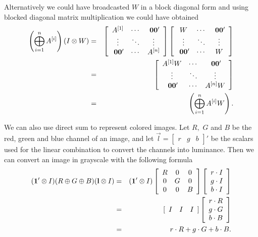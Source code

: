 \documentclass{sapthesis}
\begin{document}
Alternatively we could have broadcasted \(W\) in a block diagonal form and using
blocked diagonal matrix multiplication we could have obtained
\begin{eqnarray*}
\left(\bigoplus_{i=1}^n A^{[i]}\right) (I \krone W)
&=& \left[\begin{array}{ccc}
    A^{[1]} & \cdots & \Z \\
    \vdots & \ddots & \vdots \\
    \Z & \cdots & A^{[n]}
\end{array}\right]
\left[\begin{array}{ccc}
    W & \cdots & \Z \\
    \vdots & \ddots & \vdots \\
    \Z & \cdots & W
\end{array}\right] \\
&=& \left[\begin{array}{ccc}
    A^{[1]} W & \cdots & \Z \\
    \vdots & \ddots & \vdots \\
    \Z & \cdots & A^{[n]} W
\end{array}\right] \\
&=& \left(\bigoplus_{i=1}^n A^{[i]} W\right).
\end{eqnarray*}

We can also use direct sum to represent colored images. Let \(R,\) \(G\) and
\(B\) be the red, green and blue channel of an image, and let  \(\vec l =
[\begin{array}{ccc}r&g&b\end{array}]'\) be the scalars used for
the linear combination to convert the channels into luminance. Then we can
convert an image in grayscale with the following formula
\begin{eqnarray*}
(\mathbf{1}' \otimes I) (R \oplus G \oplus B) (\mathbf{l} \otimes I)
&=& (\mathbf{1}' \otimes I)
\left[\begin{array}{ccc}
    R & 0 & 0 \\
    0 & G & 0 \\
    0 & 0 & B
\end{array}\right]
\left[\begin{array}{c}r \cdot I \\ g \cdot I \\ b \cdot I\end{array}\right] \\
&=& [\begin{array}{ccc}I & I & I\end{array}]
\left[\begin{array}{c}r \cdot R \\ g \cdot G \\ b \cdot B\end{array}\right] \\
&=& r \cdot R + g \cdot G + b \cdot B.
\end{eqnarray*}
\end{document}
